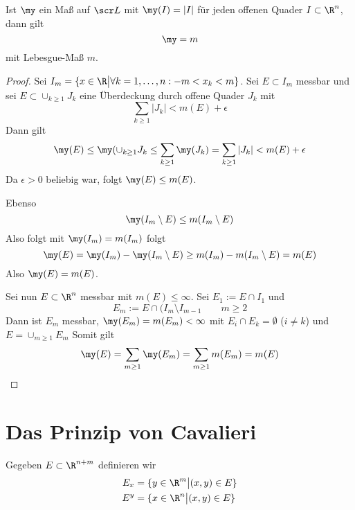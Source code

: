 \documentclass[a4paper,10pt]{scrbook}
\begin{document}
\begin{thm}
	\label{16.8}
	Ist $\my$ ein Maß auf $\scr L$ mit $\my(I) = |I|$ für jeden offenen Quader $I\subset \R^n$, dann gilt
	\[
		\my = m
	\]
	mit Lebesgue-Maß $m$.
	\begin{proof}
		Sei $I_m = \{x\in \R\big| \forall k=1,\dotsc,n: -m<x_k<m\}$.
		Sei $E\subset I_m$ messbar und sei $E\subset \cup_{k\ge 1}J_k$ eine Überdeckung durch offene Quader $J_k$ mit
		\[
			\sum_{k\ge 1}|J_k| < m(E) + \epsilon
		\]
		Dann gilt
		\[
			\my(E)  \le \my(\cup_{k\ge 1} J_k \le \sum_{k\ge 1}\my(J_k) = \sum_{k\ge 1}|J_k| < m(E) +\epsilon
		\]
		Da $\epsilon >0$ beliebig war, folgt $\my(E) \le m(E)$.

		Ebenso
		\[
			\my(I_m \setminus E) \le m(I_m \setminus E)
		\]
		Also folgt mit $\my(I_m) = m(I_m)$ folgt
		\[
			\my(E) = \my(I_m) - \my(I_m\setminus E) \ge m(I_m) - m(I_m\setminus E) = m(E)
		\]
		Also $\my(E) = m(E)$.

		Sei nun $E\subset \R^n$ messbar mit $m(E) \le \infty$.
		Sei $E_1 := E \cap I_1$ und
		\[
			E_m := E \cap ( I_m\setminus I_{m-1} \qquad m\ge2
		\]
		Dann ist $E_m$ messbar, $\my(E_m) = m(E_m)<\infty$ mit
		$E_i\cap E_k=\emptyset$ ($i\neq k$) und $E= \cup_{m\ge 1}E_m$
		Somit gilt
		\[
			\my(E) = \sum_{m\ge 1}\my(E_m) = \sum_{m\ge 1}m(E_m) = m(E)
		\]
	\end{proof}
\end{thm}


\section{Das Prinzip von Cavalieri}


\begin{df*}
	Gegeben $E\subset \R^{n+m}$ definieren wir
	\begin{align*}
		E_x &= \{y\in \R^m \big| (x,y) \in E\}\\
		E^y &= \{x\in \R^n \big| (x,y) \in E\}
	\end{align*}
\end{df*}
\end{document}
